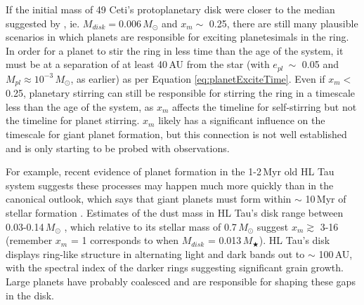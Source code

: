 If the initial mass of 49 Ceti's protoplanetary disk were closer to the median suggested by \citeauthor{Andr13}, ie. $M_{disk} = 0.006\,M_{\odot}$ and $x_{m} \sim$ 0.25, there are still many plausible scenarios in which planets are responsible for exciting planetesimals in the ring. In order for a planet to stir the ring in less time than the age of the system, it must be at a separation of at least 40\,AU from the star (with $e_{pl}~\sim$ 0.05 and $M_{pl} \approx 10^{-3}\,M_{\odot}$, as earlier) as per Equation \ref{eq:planetExciteTime}. Even if $x_{m} <$ 0.25, planetary stirring can still be responsible for stirring the ring in a timescale less than the age of the system, as $x_{m}$ affects the timeline for self-stirring but not the timeline for planet stirring. $x_m$ likely has a significant influence on the timescale for giant planet formation, but this connection is not well established and is only starting to be probed with observations. 


For example, recent evidence of planet formation in the 1-2\,Myr old HL Tau system \citep{Part15} suggests these processes may happen much more quickly than in the canonical outlook, which says that giant planets must form within $\sim$ 10\,Myr of stellar formation \citep{Poll96}. Estimates of the dust mass in HL Tau's disk range between 0.03-0.14\,$M_{\odot}$ \citep{Robi07}, which relative to its stellar mass of 0.7\,$M_{\odot}$ \citep{Clos97} suggest $x_{m} \gtrsim$ 3-16 (remember $x_{m}$ = 1 corresponds to when $M_{disk}$ = 0.013\,$M_{\bigstar}$). HL Tau's disk displays ring-like structure in alternating light and dark bands out to $\sim$ 100\,AU, with the spectral index of the darker rings suggesting significant grain growth. Large planets have probably coalesced and are responsible for shaping these gaps in the disk.


